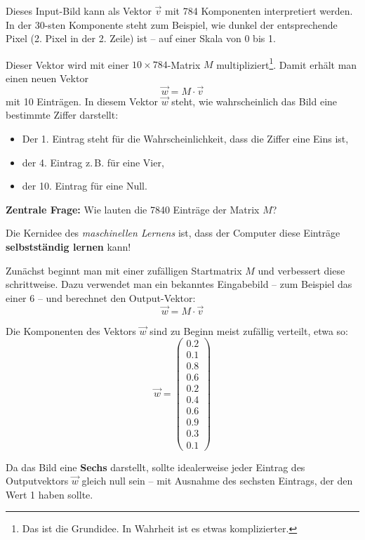Dieses Input-Bild kann als Vektor \( \vec{v} \) mit 784 Komponenten interpretiert werden. In der \( 30 \)-sten Komponente steht zum Beispiel, wie dunkel der entsprechende Pixel (2. Pixel in der 2. Zeile) ist – auf einer Skala von 0 bis 1.

\medskip

Dieser Vektor wird mit einer \( 10 \times 784 \)-Matrix \( M \) multipliziert\footnote{Das ist die Grundidee. In Wahrheit ist es etwas komplizierter.}. Damit erhält man einen neuen Vektor
\[
	\vec{w} = M \cdot \vec{v}
\]
mit 10 Einträgen. In diesem Vektor \( \vec{w} \) steht, wie wahrscheinlich das Bild eine bestimmte Ziffer darstellt:

\begin{itemize}
	\item Der 1. Eintrag steht für die Wahrscheinlichkeit, dass die Ziffer eine Eins ist,
	\item der 4. Eintrag z.\,B. für eine Vier,
	\item der 10. Eintrag für eine Null.
\end{itemize}

\medskip

\textbf{Zentrale Frage:} Wie lauten die 7840 Einträge der Matrix \( M \)?

Die Kernidee des \emph{maschinellen Lernens} ist, dass der Computer diese Einträge \textbf{selbstständig lernen} kann!

\medskip

Zunächst beginnt man mit einer zufälligen Startmatrix \( M \) und verbessert diese schrittweise. Dazu verwendet man ein bekanntes Eingabebild – zum Beispiel das einer 6 – und berechnet den Output-Vektor:
\[
	\vec{w} = M \cdot \vec{v}
\]


Die Komponenten des Vektors \( \vec{w} \) sind zu Beginn meist zufällig verteilt, etwa so:
\[
	\vec{w} =
	\begin{pmatrix}
		0.2 \\
		0.1 \\
		0.8 \\
		0.6 \\
		0.2 \\
		0.4 \\
		0.6 \\
		0.9 \\
		0.3 \\
		0.1
	\end{pmatrix}
\]

Da das Bild eine \textbf{Sechs} darstellt, sollte idealerweise jeder Eintrag des Outputvektors \( \vec{w} \) gleich null sein – mit Ausnahme des sechsten Eintrags, der den Wert 1 haben sollte.

